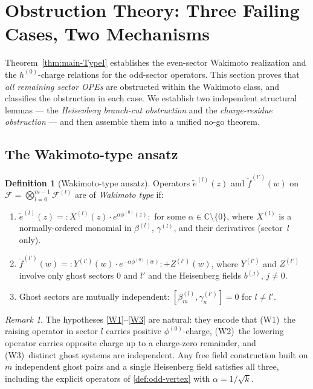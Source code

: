 \documentclass[12pt]{article}
\theoremstyle{plain}
\theoremstyle{definition}
\newtheorem{definition}[theorem]{Definition}
\theoremstyle{remark}
\newtheorem{remark}[theorem]{Remark}
\newcommand{\C}{\mathbb{C}}
\newcommand{\bl}[1]{\beta^{(#1)}}
\newcommand{\gl}[1]{\gamma^{(#1)}}
\newcommand{\Fl}[1]{\mathcal{F}^{(#1)}}
\newcommand{\no}[1]{:\!#1\!:}
\begin{document}
\section{Obstruction Theory: Three Failing Cases, Two Mechanisms}
\label{sec:obstruction}

Theorem~\ref{thm:main-TypeI} establishes the even-sector Wakimoto realization
and the $h^{(0)}$-charge relations for the odd-sector operators.
This section proves that \emph{all remaining sector OPEs} are obstructed
within the Wakimoto class, and classifies the obstruction in each case.
We establish two independent structural lemmas — the
\emph{Heisenberg branch-cut obstruction} and the \emph{charge-residue obstruction}
— and then assemble them into a unified no-go theorem.

\subsection{The Wakimoto-type ansatz}
\label{subsec:Wansatz}

\begin{definition}[Wakimoto-type ansatz]
\label{def:Wtype}
  Operators $\widetilde{e}^{(l)}(z)$ and $\widetilde{f}^{(l')}(w)$
  on $\mathcal{F}=\bigotimes_{l=0}^{m-1}\Fl{l}$ are of \emph{Wakimoto type} if:
  \begin{enumerate}[label=\textup{(W\arabic*)}]
    \item\label{W1} $\widetilde{e}^{(l)}(z)=\no{X^{(l)}(z)\cdot e^{\alpha\phi^{(0)}(z)}}$
      for some $\alpha\in\C\setminus\{0\}$, where $X^{(l)}$ is a normally-ordered monomial
      in $\bl{l}$, $\gl{l}$, and their derivatives (sector~$l$ only).
    \item\label{W2} $\widetilde{f}^{(l')}(w)=\no{Y^{(l')}(w)\cdot e^{-\alpha\phi^{(0)}(w)}}
      +Z^{(l')}(w)$, where $Y^{(l')}$ and $Z^{(l')}$ involve only
      ghost sectors $0$ and $l'$ and the Heisenberg fields $b^{(j)}$, $j\neq 0$.
    \item\label{W3} Ghost sectors are mutually independent: $[\bl{l}_m,\gl{l'}_n]=0$
      for $l\neq l'$.
  \end{enumerate}
\end{definition}

\begin{remark}
\label{rem:no-go-scope}
  The hypotheses \ref{W1}--\ref{W3} are natural: they encode that (W1)~the raising
  operator in sector $l$ carries positive $\phi^{(0)}$-charge, (W2)~the lowering
  operator carries opposite charge up to a charge-zero remainder, and
  (W3)~distinct ghost systems are independent.
  Any free field construction built on $m$ independent ghost pairs and a single
  Heisenberg field satisfies all three, including the explicit operators of
  \cref{def:odd-vertex} with $\alpha=1/\sqrt{k}$.
\end{remark}
\end{document}
